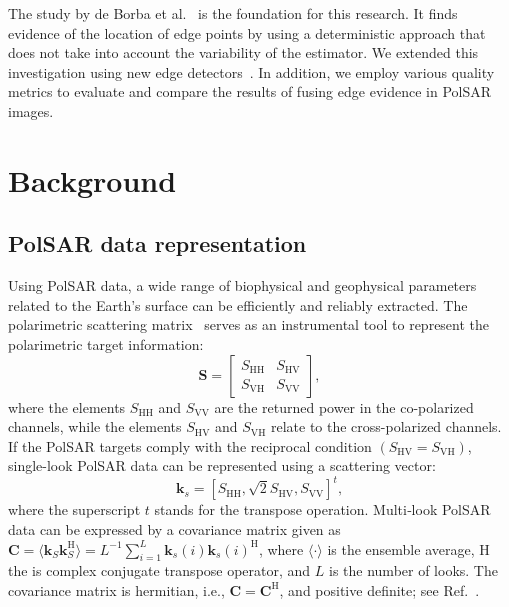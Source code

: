 \documentclass{article}
\begin{document}
The study by de Borba et al.~\cite{DeBorba2020} is the foundation for this research. 
It finds evidence of the location of edge points by using a deterministic approach that does not take into account the variability of the estimator. 
We extended this investigation using new edge detectors~\cite{Xiang2016, Nascimento2014,Shi2020}. 
In addition, we employ various quality metrics to evaluate and compare the results of fusing edge evidence in PolSAR images.

\section{Background}
\subsection{PolSAR data representation}

Using PolSAR data, a wide range of biophysical and geophysical parameters related to the Earth's surface can be efficiently and reliably extracted. The polarimetric scattering matrix~\cite{Lee2017} serves as an instrumental tool to represent the polarimetric target information:
\begin{equation}
 \mathbf{S} = \begin{bmatrix}
S_{\text{HH}} & S_{\text{HV}} \\
S_{\text{VH}} & S_{\text{VV}}
\end{bmatrix},  
\label{E:a1}
\end{equation}
where the elements $S_{\text{HH}}$ and $S_{\text{VV}}$ are the returned power in the co-polarized channels, while the elements $S_{\text{HV}}$ and $S_{\text{VH}}$ relate to the cross-polarized channels.
If the PolSAR targets comply with the reciprocal condition $(S_{\text{HV}} = S_{\text{VH}})$, single-look PolSAR data can be represented using a scattering vector:
\begin{equation}
\mathbf{k}_s=[S_{\text{HH}}, \sqrt{2}S_{\text{HV}}, S_{\text{VV}} ]^t,
\label{E:21}
\end{equation}
where  the superscript $t$ stands for the transpose operation. 
Multi‑look PolSAR data can be expressed  by a covariance matrix  given as 
\(\mathbf{C}=\langle\mathbf{k}_S\mathbf{k}_S^\text{H} \rangle= {L}^{-1} \sum_{i=1}^{L} \mathbf{k}_s(i)\mathbf{k}_s(i)^\text{H} \), where $\langle \cdot \rangle$ is the ensemble average, $\text{H}$  the is complex conjugate transpose operator, and $L$ is the number of looks. 
The covariance matrix is hermitian, i.e., $\mathbf{C}= \mathbf{C}^\text{H}$, and positive definite;
see Ref.~\cite{Qin2022}.
\end{document}
